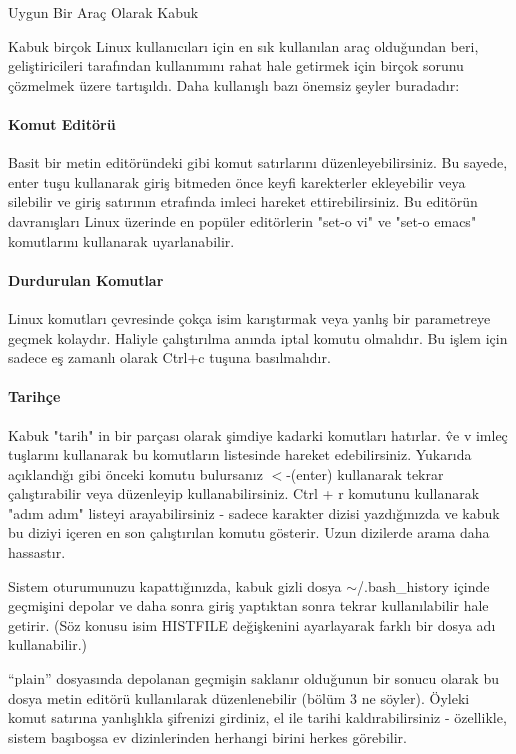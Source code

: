 \begin{section}{Uygun Bir Araç Olarak Kabuk}

Kabuk birçok Linux kullanıcıları için en sık kullanılan araç olduğundan beri, geliştiricileri tarafından kullanımını rahat hale getirmek için birçok sorunu çözmelmek üzere tartışıldı. Daha kullanışlı bazı önemsiz şeyler buradadır:

\paragraph{Komut Editörü} {Basit bir metin editöründeki gibi komut satırlarını düzenleyebilirsiniz. Bu sayede, enter tuşu kullanarak giriş bitmeden önce keyfi karekterler ekleyebilir veya silebilir ve giriş satırının etrafında imleci hareket ettirebilirsiniz. Bu editörün davranışları Linux üzerinde en popüler editörlerin "set-o vi" ve "set-o emacs" komutlarını kullanarak uyarlanabilir.}
\paragraph{Durdurulan Komutlar}{Linux komutları çevresinde çokça isim karıştırmak veya yanlış bir parametreye geçmek kolaydır. Haliyle çalıştırılma anında iptal komutu olmalıdır. Bu işlem için sadece eş zamanlı olarak Ctrl+c tuşuna basılmalıdır.}
\paragraph{Tarihçe}{Kabuk "tarih" in bir parçası olarak şimdiye kadarki komutları hatırlar. \^ ve v imleç tuşlarını kullanarak bu komutların listesinde hareket edebilirsiniz. Yukarıda açıklandığı gibi önceki komutu bulursanız $<$-(enter) kullanarak tekrar çalıştırabilir veya düzenleyip kullanabilirsiniz. Ctrl + r komutunu kullanarak "adım adım" listeyi arayabilirsiniz - sadece karakter dizisi yazdığınızda ve kabuk bu diziyi içeren en son çalıştırılan komutu gösterir. Uzun dizilerde arama daha hassastır.}

Sistem oturumunuzu kapattığınızda, kabuk gizli dosya $\sim$/.bash\_history içinde geçmişini depolar ve daha sonra giriş yaptıktan sonra tekrar kullanılabilir hale getirir. (Söz konusu isim HISTFILE değişkenini ayarlayarak farklı bir dosya adı kullanabilir.)

“plain” dosyasında depolanan geçmişin saklanır olduğunun bir sonucu olarak bu dosya metin editörü kullanılarak düzenlenebilir (bölüm 3 ne söyler). Öyleki
komut satırına yanlışlıkla şifrenizi girdiniz, el ile tarihi kaldırabilirsiniz - özellikle, sistem başıboşsa ev dizinlerinden herhangi birini herkes görebilir.

\end{section}
